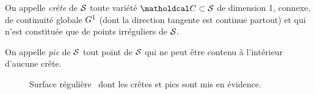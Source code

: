 \begin{definition}[Crête]
	On appelle \emph{crête} de $\mathcal{S}$ toute variété $\crete \subset \interface$ de dimension 1, connexe, de continuité globale $G^{1}$ (\ie dont la direction tangente est continue partout) et qui n'est constituée que de points irréguliers de $\mathcal{S}$.
\end{definition}

\begin{definition}[pic]
	On appelle \emph{pic} de $\mathcal{S}$ tout point de $\mathcal{S}$ qui ne peut être contenu à l'intérieur d'aucune crête.
\end{definition}



\begin{figure}
	\centering
	
	\caption{Surface régulière \piecewise\ dont les crêtes et pics sont mis en évidence.}
	\label{fig:piecewise_smooth_surface_decomposition}
\end{figure}


